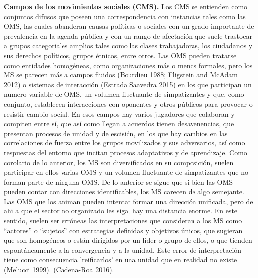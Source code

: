 \documentclass[letterpaper, 11pt]{book}
\theoremstyle{definition}
\theoremstyle{remark}
\begin{document}
{{{\textbf{Campos de los movimientos sociales (CMS).}  \small{Los CMS se entienden como conjuntos difusos que poseen una correspondencia con instancias tales como las OMS, las cuales abanderan causas políticas o sociales con un grado importante de prevalencia en la agenda pública y con un rango de afectación que suele trastocar a grupos categoriales amplios tales como las clases trabajadoras, los ciudadanos y sus derechos políticos, grupos étnicos, entre otros.
Las OMS pueden tratarse como entidades homogéneas, como organizaciones más o menos formales, pero los MS se parecen más a campos fluidos (Bourdieu 1988; Fligstein and McAdam 2012) o sistemas de interacción (Estrada Saavedra 2015) en los que participan un numero variable de OMS, un volumen fluctuante de simpatizantes y que, como conjunto, establecen interacciones con oponentes y otros públicos para provocar o resistir cambio social.
En esos campos hay varios jugadores que colaboran y compiten entre sí, que así como llegan a acuerdos tienen desavenencias, que presentan procesos de unidad y de escisión, en los que hay cambios en las correlaciones de fuerza entre los grupos movilizados y sus adversarios, así como respuestas del entorno que incitan procesos adaptativos y de aprendizaje.
Como corolario de lo anterior, los MS son diversificados en su composición, suelen participar en ellos varias OMS y un volumen fluctuante de simpatizantes que no forman parte de ninguna OMS.
De lo anterior se sigue que si bien las OMS pueden contar con direcciones identificables, los MS carecen de algo semejante.
Las OMS que los animan pueden intentar formar una dirección unificada, pero de ahí a que el sector no organizado les siga, hay una distancia enorme.
En este sentido, suelen ser erróneas las interpretaciones que consideran a los MS como ``actores'' o ``sujetos'' con estrategias definidas y objetivos únicos, que sugieran que son homogéneos o están dirigidos por un líder o grupo de ellos, o que tienden espontáneamente a la convergencia y a la unidad.
Este error de interpretación tiene como consecuencia 'reificarlos' en una unidad que en realidad no existe (Melucci 1999).
(Cadena-Roa 2016).}\vspace{1em}


}}}
\end{document}
